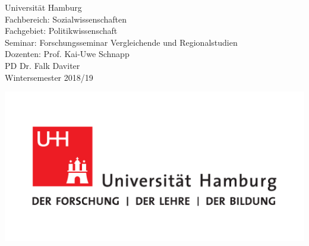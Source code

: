 
\begin{titlepage}

\setcounter{page}{-1}    

\begin{minipage}[t]{0.6\textwidth}
\flushleft 
			Universität Hamburg \\
			Fachbereich: Sozialwissenschaften \\
			Fachgebiet: Politikwissenschaft \\
			Seminar: Forschungsseminar Vergleichende und Regionalstudien \\ 
			Dozenten: Prof. Kai-Uwe Schnapp \\
			PD Dr. Falk Daviter \\
			Wintersemester 2018/19 \\
\end{minipage}
\hfill
\begin{minipage}[t][1.7cm][b]{0.35\textwidth}
\noindent\includegraphics[width=\textwidth]{images/UHH-Logo_2010_Farbe_CMYK.pdf}
\end{minipage}

\vspace*{\fill}
\begin{center}
	\vspace{1cm}\noindent {\textbf{\thesisType}} \vspace{0.2cm} \\
	\textbf{\Large \myTitle} \\
	\textbf{\mySubTitle} \\
	\dateOfSubmission \\
\end{center}
\vspace*{\fill}


\end{titlepage}
